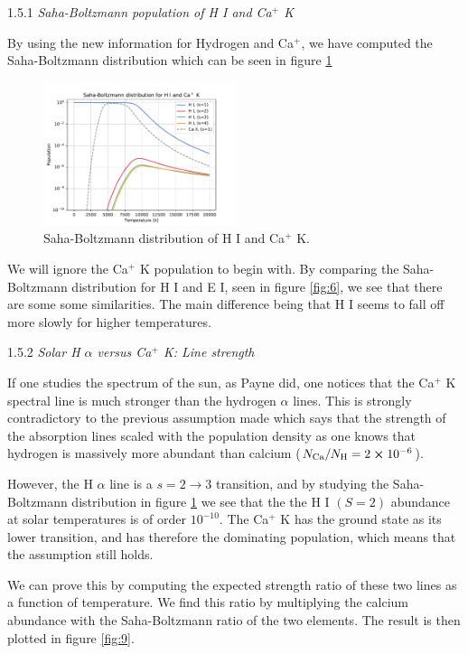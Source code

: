 \documentclass[a4paper,11.5pt,]{article}
\begin{document}
\begin{multicols}{2}
\begin{center}
1.5.1\textit{ Saha-Boltzmann population of H I and Ca$^+$ K}
\end{center}

\noindent By using the new information for Hydrogen and Ca$^+$, we have computed the Saha-Boltzmann distribution which can be seen in figure \ref{fig:8}

\begin{figure}[H]
	\centering
	\includegraphics[width=0.5\textwidth]{SSA/figures/sahabolt_HCA.pdf}
	\caption{Saha-Boltzmann distribution of H I and Ca$^+$ K.}
	\label{fig:8}
\end{figure}

\noindent We will ignore the Ca$^+$ K population to begin with. By comparing the Saha-Boltzmann distribution for H I and E I, seen in figure \ref{fig:6}, we see that there are some some similarities. The main difference being that H I seems to fall off more slowly for higher temperatures.

\begin{center}
1.5.2\textit{ Solar H $\alpha$ versus Ca$^+$ K: Line strength}
\end{center}
If one studies the spectrum of the sun, as Payne did, one notices that the Ca$^+$ K spectral line is much stronger than the hydrogen $\alpha$ lines. This is strongly contradictory to the previous assumption made which says that the strength of the absorption lines scaled with the population density as one knows that hydrogen is massively more abundant than calcium ($N_\text{Ca}/N_\text{H} = 2 \cross 10^{-6}$). 

However, the H $\alpha$ line is a $s = 2 \rightarrow 3$ transition, and by studying the Saha-Boltzmann distribution in figure \ref{fig:8} we see that the the H I $(S=2)$ abundance at solar temperatures is of order $10^{-10}$. The Ca$^+$ K has the ground state as its lower transition, and has therefore the dominating population, which means that the assumption still holds.

We can prove this by computing the expected strength ratio of these two lines as a function of temperature. We find this ratio by multiplying the calcium abundance with the Saha-Boltzmann ratio of the two elements. The result is then plotted in figure \ref{fig:9}. 


\end{multicols}
\end{document}
